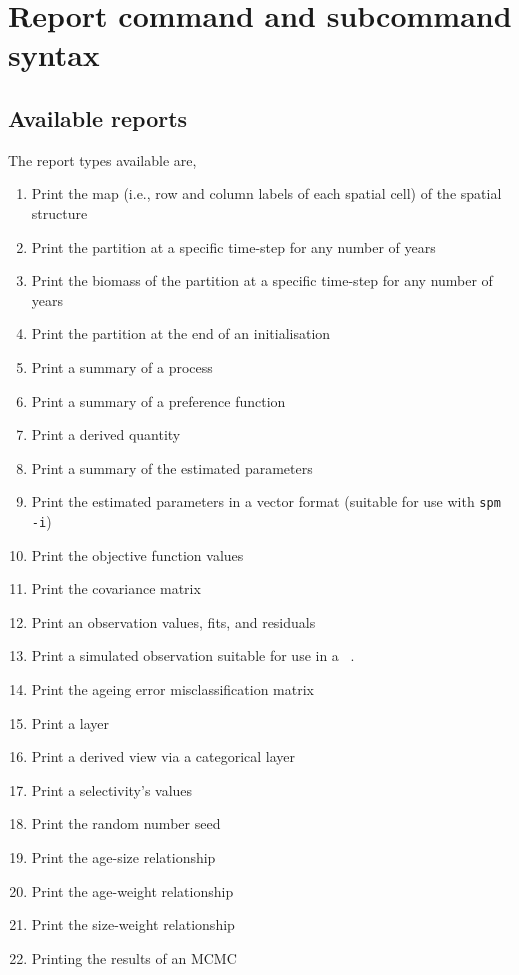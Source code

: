 \section{Report command and subcommand syntax\label{sec:report-syntax}}

\subsection{Available reports}

The report types available are,

\begin{enumerate}
  \item Print the map (i.e., row and column labels of each spatial cell) of the spatial structure
  \item Print the partition at a specific time-step for any number of years
  \item Print the biomass of the partition at a specific time-step for any number of years
  \item Print the partition at the end of an initialisation
  \item Print a summary of a process
	\item Print a summary of a preference function
  \item Print a derived quantity
  \item Print a summary of the estimated parameters
  \item Print the estimated parameters in a vector format (suitable for use with \texttt{spm -i})
  \item Print the objective function values
  \item Print the covariance matrix
  \item Print an observation values, fits, and residuals
  \item Print a simulated observation suitable for use in a \SPM\ \config.
  \item Print the ageing error misclassification matrix
  \item Print a layer
  \item Print a derived view via a categorical layer
  \item Print a selectivity's values
  \item Print the random number seed
  \item Print the age-size relationship
  \item Print the age-weight relationship
  \item Print the size-weight relationship
  \item Printing the results of an MCMC
\end{enumerate}

